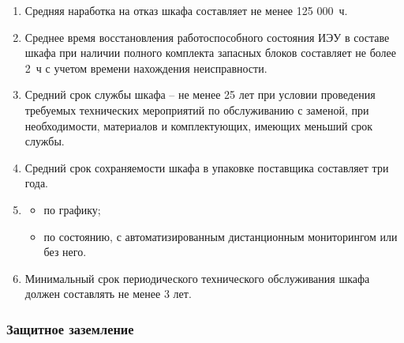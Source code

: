 \begin{enumerate}[label=\arabic{section}.\arabic{subsection}.\arabic{subsubsection}.\arabic*, align=left, labelsep=4pt, leftmargin=0pt, itemindent=2cm]

\item
Средняя наработка на отказ шкафа составляет не менее 125 000~ч.

\item
Среднее время восстановления работоспособного состояния ИЭУ в составе шкафа при наличии полного комплекта запасных блоков составляет не более 2~ч с учетом времени нахождения неисправности.

\item
Средний срок службы шкафа -- не менее 25 лет при условии проведения требуемых технических мероприятий по обслуживанию с заменой, при необходимости, материалов и комплектующих, имеющих меньший срок службы.

\item
Средний срок сохраняемости шкафа в упаковке поставщика составляет три года.

\item
{}
\begin{itemize}
\item по графику;
\item по состоянию, с автоматизированным дистанционным мониторингом или без него.
\end{itemize}

\item
Минимальный срок периодического технического обслуживания шкафа должен составлять не менее 3 лет.

\end{enumerate}

\subsubsection{Защитное заземление}

